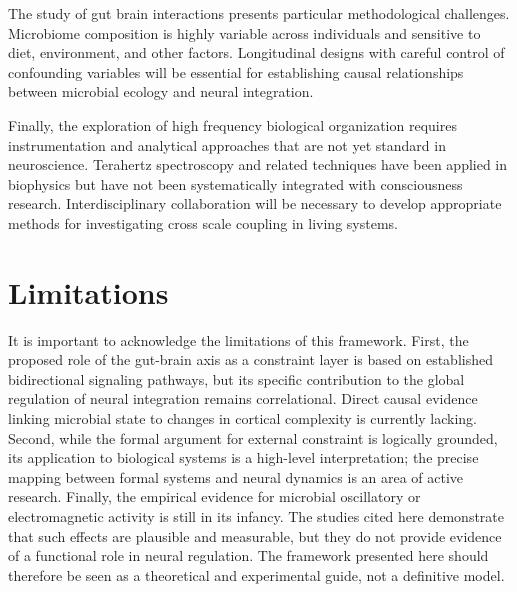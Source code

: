 \documentclass[12pt,letterpaper]{article}
\begin{document}
The study of gut brain interactions presents particular methodological challenges. Microbiome composition is highly variable across individuals and sensitive to diet, environment, and other factors. Longitudinal designs with careful control of confounding variables will be essential for establishing causal relationships between microbial ecology and neural integration.

Finally, the exploration of high frequency biological organization requires instrumentation and analytical approaches that are not yet standard in neuroscience. Terahertz spectroscopy and related techniques have been applied in biophysics but have not been systematically integrated with consciousness research. Interdisciplinary collaboration will be necessary to develop appropriate methods for investigating cross scale coupling in living systems.

\section{Limitations}

It is important to acknowledge the limitations of this framework. First, the proposed role of the gut-brain axis as a constraint layer is based on established bidirectional signaling pathways, but its specific contribution to the global regulation of neural integration remains correlational. Direct causal evidence linking microbial state to changes in cortical complexity is currently lacking. Second, while the formal argument for external constraint is logically grounded, its application to biological systems is a high-level interpretation; the precise mapping between formal systems and neural dynamics is an area of active research. Finally, the empirical evidence for microbial oscillatory or electromagnetic activity is still in its infancy. The studies cited here demonstrate that such effects are plausible and measurable, but they do not provide evidence of a functional role in neural regulation. The framework presented here should therefore be seen as a theoretical and experimental guide, not a definitive model.




\end{document}
